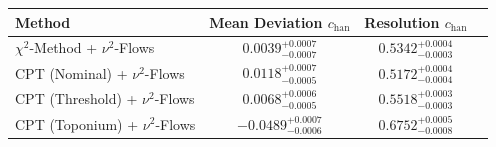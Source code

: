     \begin{tabular}{lccc}
        \toprule
        Method & Mean Deviation $c_{\text{han}}$ & Resolution $c_{\text{han}}$ \\
        \midrule
        $\chi^2$-Method + $\nu^2$-Flows & $0.0039^{+0.0007}_{-0.0007}$ & $0.5342^{+0.0004}_{-0.0003}$ \\
        CPT (Nominal) + $\nu^2$-Flows & $0.0118^{+0.0007}_{-0.0005}$ & $0.5172^{+0.0004}_{-0.0004}$ \\
        CPT (Threshold) + $\nu^2$-Flows & $0.0068^{+0.0006}_{-0.0005}$ & $0.5518^{+0.0003}_{-0.0003}$ \\
        CPT (Toponium) + $\nu^2$-Flows & $-0.0489^{+0.0007}_{-0.0006}$ & $0.6752^{+0.0005}_{-0.0008}$ \\
        \bottomrule
    \end{tabular}